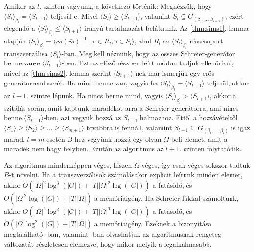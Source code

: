 Amikor az $l$. szinten vagyunk, a következő történik:
Megnézzük, hogy $\langle S_l \rangle_{\beta_l} = \langle S_{l+1} \rangle$ teljesül-e.
Mivel $\langle S_l \rangle \ge \langle S_{l+1} \rangle$, valamint $S_l \subseteq G_{(\beta_1, \dots, \beta_{l-1})}$, ezért elegendő a $\langle S_l \rangle_{\beta_l} \le \langle S_{l+1} \rangle$ irányú tartalmazást belátnunk.
Az \ref{thm:sims1}. lemma alapján $\langle S_l \rangle_{\beta_l} = \langle rs(\overline{rs})^{-1} \mid r\in R_l, s\in S_l \rangle$, ahol $R_l$ az $\langle S_l \rangle_{\beta_l}$ részcsoport transzverzálisa $\langle S_l \rangle$-ban.
Meg kell néznünk, hogy az összes Schreier-generátor benne van-e $\langle S_{l+1} \rangle$-ben.
Ezt az előző részben leírt módon tudjuk ellenőrizni, mivel az \ref{thm:sims2}. lemma szerint $\langle S_{l+1} \rangle$-nek már ismerjük egy erős generátorrendszerét.
Ha mind benne van, vagyis ha $\langle S_l \rangle_{\beta_l} = \langle S_{l+1} \rangle$ teljesül, akkor az $l-1$. szintre lépünk.
Ha nincs benne mind, vagyis $\langle S_l \rangle_{\beta_l} > \langle S_{l+1} \rangle$, akkor a szitálás során, amit kaptunk maradékot arra a Schreier-generátorra, ami nincs benne $\langle S_{l+1} \rangle$-ben,
azt vegyük hozzá az $S_{l+1}$ halmazhoz.
Ettől a hozzávételtől $\langle S_1 \rangle \ge \langle S_2 \rangle \ge \dots \ge \langle S_{m+1} \rangle$ továbbra is fennáll, valamint $S_{l+1} \subseteq G_{(\beta_1, \dots, \beta_{l})}$ is igaz marad.
$l = m$ esetén $B$-hez vegyünk hozzá egy olyan $\Omega$-beli elemet, amit a maradék nem hagy helyben.
Ezután az algoritmus az $l+1$. szinten folytatódik.

Az algoritmus mindenképpen véges, hiszen $\Omega$ véges, így csak véges sokszor tudtuk $B$-t növelni.
Ha a transzverzálisok számolásakor explicit leírunk minden elemet, akkor $O(|\Omega|^2 \log^3(|G|) + |T||\Omega|^2 \log(|G|))$ a futásidő, és $O(|\Omega|^2 \log(|G|) + |T||\Omega|)$ a memóriaigény.
Ha Schreier-fákkal számoltunk, akkor $O(|\Omega|^3 \log^3(|G|) + |T||\Omega|^3 \log(|G|))$ a futásidő, és $O(|\Omega| \log^2(|G|) + |T||\Omega|)$ a memóriaigény.
Ezeknek a bizonyítása megtalálható \cite{Ser03}-ban, valamint \cite{Mur03}-ban olvashatjuk az algoritmusnak rengeteg változatát részletesen elemezve, hogy mikor melyik a legalkalmasabb.

